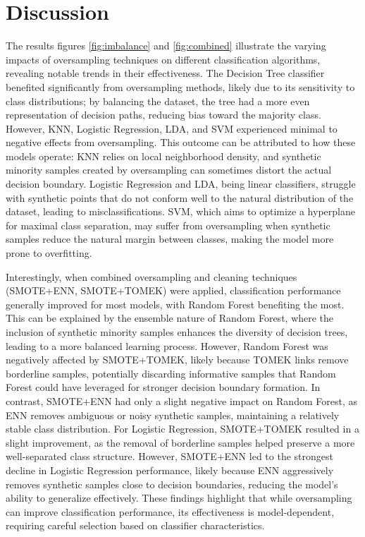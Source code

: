 \documentclass[letterpaper]{report}
\begin{document}
\chapter{Discussion}
\label{section:discussion}
The results figures \ref{fig:imbalance} and \ref{fig:combined} illustrate the varying impacts of oversampling techniques on different classification algorithms, revealing notable trends in their effectiveness. The Decision Tree classifier benefited significantly from oversampling methods, likely due to its sensitivity to class distributions; by balancing the dataset, the tree had a more even representation of decision paths, reducing bias toward the majority class. However, KNN, Logistic Regression, LDA, and SVM experienced minimal to negative effects from oversampling. This outcome can be attributed to how these models operate: KNN relies on local neighborhood density, and synthetic minority samples created by oversampling can sometimes distort the actual decision boundary. Logistic Regression and LDA, being linear classifiers, struggle with synthetic points that do not conform well to the natural distribution of the dataset, leading to misclassifications. SVM, which aims to optimize a hyperplane for maximal class separation, may suffer from oversampling when synthetic samples reduce the natural margin between classes, making the model more prone to overfitting.

Interestingly, when combined oversampling and cleaning techniques (SMOTE+ENN, SMOTE+TOMEK) were applied, classification performance generally improved for most models, with Random Forest benefiting the most. This can be explained by the ensemble nature of Random Forest, where the inclusion of synthetic minority samples enhances the diversity of decision trees, leading to a more balanced learning process. However, Random Forest was negatively affected by SMOTE+TOMEK, likely because TOMEK links remove borderline samples, potentially discarding informative samples that Random Forest could have leveraged for stronger decision boundary formation. In contrast, SMOTE+ENN had only a slight negative impact on Random Forest, as ENN removes ambiguous or noisy synthetic samples, maintaining a relatively stable class distribution. For Logistic Regression, SMOTE+TOMEK resulted in a slight improvement, as the removal of borderline samples helped preserve a more well-separated class structure. However, SMOTE+ENN led to the strongest decline in Logistic Regression performance, likely because ENN aggressively removes synthetic samples close to decision boundaries, reducing the model’s ability to generalize effectively. These findings highlight that while oversampling can improve classification performance, its effectiveness is model-dependent, requiring careful selection based on classifier characteristics.
\end{document}
